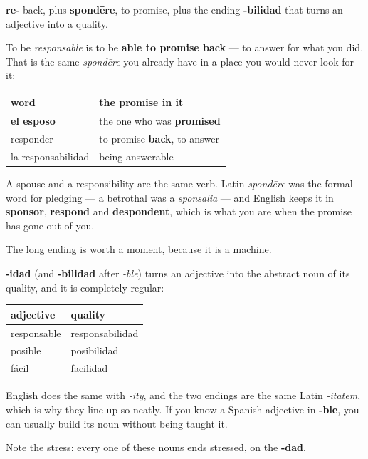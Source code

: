 \begin{cousinweb}
\textbf{re-} back, plus \textbf{spondēre}, to promise, plus the ending \textbf{-bilidad} that turns an adjective into a quality.

To be \emph{responsable} is to be \textbf{able to promise back} — to answer for what you did. That is the same \emph{spondēre} you already have in a place you would never look for it:

\noindent
\begin{tabularx}{\linewidth}{@{}>{\raggedright\arraybackslash}X>{\raggedright\arraybackslash}X@{}}
\toprule
\textbf{word} & \textbf{the promise in it} \\
\midrule
\textbf{el esposo} & the one who was \textbf{promised} \\
responder & to promise \textbf{back}, to answer \\
la responsabilidad & being answerable \\
\bottomrule
\end{tabularx}

A spouse and a responsibility are the same verb. Latin \emph{spondēre} was the formal word for pledging — a betrothal was a \emph{sponsalia} — and English keeps it in \textbf{sponsor}, \textbf{respond} and \textbf{despondent}, which is what you are when the promise has gone out of you.
\end{cousinweb}

\begin{culture}
The long ending is worth a moment, because it is a machine.

\textbf{-idad} (and \textbf{-bilidad} after \emph{-ble}) turns an adjective into the abstract noun of its quality, and it is completely regular:

\noindent
\begin{tabularx}{\linewidth}{@{}>{\raggedright\arraybackslash}X>{\raggedright\arraybackslash}X@{}}
\toprule
\textbf{adjective} & \textbf{quality} \\
\midrule
responsable & responsabilidad \\
posible & posibilidad \\
fácil & facilidad \\
\bottomrule
\end{tabularx}

English does the same with \emph{-ity}, and the two endings are the same Latin \emph{-itātem}, which is why they line up so neatly. If you know a Spanish adjective in \textbf{-ble}, you can usually build its noun without being taught it.

Note the stress: every one of these nouns ends stressed, on the \textbf{-dad}.
\end{culture}

